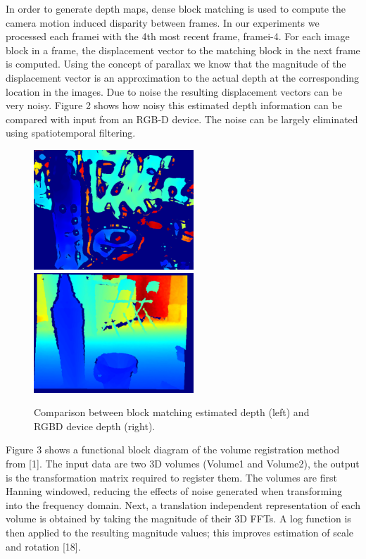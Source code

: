 In order to generate depth maps, dense block matching is used to compute the camera motion induced disparity between frames. In our experiments we processed each framei with the 4th most recent frame, framei-4. For each image block in a frame, the displacement vector to the matching block in the next frame is computed. Using the concept of parallax we know that the magnitude of the displacement vector is an approximation to the actual depth at the corresponding location in the images. Due to noise the resulting displacement vectors can be very noisy. Figure 2 shows how noisy this estimated depth information can be compared with input from an RGB-D device. The noise can be largely eliminated using spatiotemporal filtering. \\



\begin{figure}[!htb]
\centering
\includegraphics[width=6cm]{images/methodology/FVR/home_depth_frame_mono}
\includegraphics[width=6cm]{images/methodology/FVR/home_depth_frame}
\caption{Comparison between block matching estimated depth (left) and RGBD device depth (right).}
\label{fig:DepthGenerationExample}
\end{figure}
 


Figure 3 shows a functional block diagram of the volume registration method from [1]. The input data are two 3D volumes (Volume1 and Volume2), the output is the transformation matrix required to register them. The volumes are first Hanning windowed, reducing the effects of noise generated when transforming into the frequency domain. Next, a translation independent representation of each volume is obtained by taking the magnitude of their 3D FFTs. A log function is then applied to the resulting magnitude values; this improves estimation of scale and rotation [18]. \\

